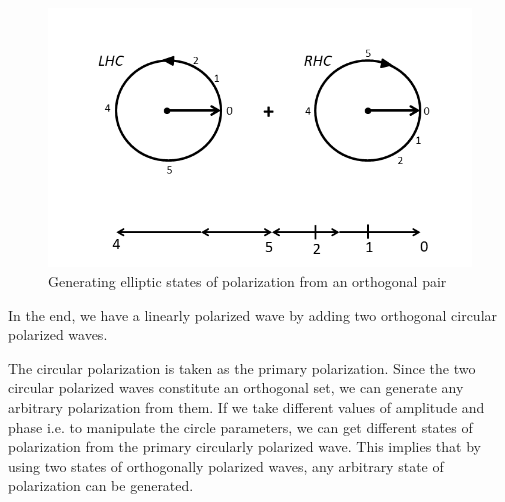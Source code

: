 \begin{figure}[h]
\centering
\includegraphics[width=1\linewidth]{"./graphics/generatingEP"}
\caption{Generating elliptic states of polarization from an orthogonal pair}
\label{fig:linear-polarized}
\end{figure}

In the end, we have a linearly polarized wave by adding two orthogonal circular polarized waves.

The circular polarization is taken as the primary polarization. Since the two circular polarized waves constitute an orthogonal set, we can generate any arbitrary polarization from them. If we take different values of amplitude and phase i.e. to manipulate the circle parameters, we can get different states of polarization from the primary circularly polarized wave. This implies that by using two states of orthogonally polarized waves, any arbitrary state of polarization can be generated.

